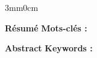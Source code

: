 

\pagestyle{empty}
\markboth{}{}

\begin{changemargin}{3mm}{0cm}

    \vskip1mm
    {\LARGE\textbf{Résumé}}
    \vskip1mm
    \begingroup
        \large
        \@frenchAbstract
    \endgroup
    \vskip1mm
    {\textbf{Mots-clés : }
        \begingroup
            \@frenchAbstractKeywords
        \endgroup
    }

    \vskip8mm

    {\LARGE\textbf{Abstract}}
    \vskip1mm
    \begingroup
        \large
        \@englishAbstract
    \endgroup
    \vskip1mm
    {\textbf{Keywords : }
        \begingroup
            \@englishAbstractKeywords
        \endgroup
    }
\end{changemargin}
